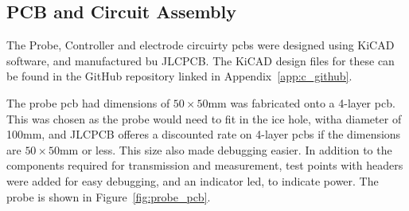 \subsection{PCB and Circuit Assembly}
The Probe, Controller and electrode circuirty \gls{pcb}s were designed using KiCAD software, and manufactured bu JLCPCB. The KiCAD design files for these can be found in the GitHub repository linked in Appendix~\ref{app:c_github}.

The probe \gls{pcb} had dimensions of $50\times50$mm was fabricated onto a 4-layer \gls{pcb}.
This was chosen as the probe would need to fit in the ice hole, witha diameter of 100mm, and JLCPCB offeres a discounted rate on 4-layer \gls{pcb}s if the dimensions are $50\times50$mm or less. 
This size also made debugging easier.
In addition to the components required for transmission and measurement, test points with headers were added for easy debugging, and an indicator \gls{led}, to indicate power.
The probe is shown in Figure~\ref{fig:probe_pcb}.

